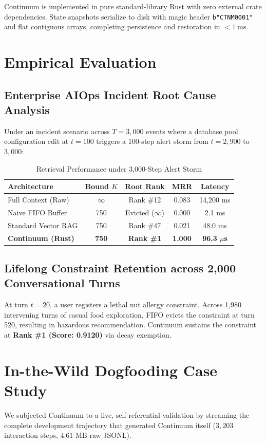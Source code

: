 \documentclass[10pt,journal,compsoc]{IEEEtran}
\begin{document}
Continuum is implemented in pure standard-library Rust with zero external crate dependencies. State snapshots serialize to disk with magic header \texttt{b"CTNM0001"} and flat contiguous arrays, completing persistence and restoration in $< 1\ \text{ms}$.

\section{Empirical Evaluation}

\subsection{Enterprise AIOps Incident Root Cause Analysis}
Under an incident scenario across $T = 3,000$ events where a database pool configuration edit at $t = 100$ triggers a 100-step alert storm from $t = 2,900$ to $3,000$:

\begin{table}[h]
\caption{Retrieval Performance under 3,000-Step Alert Storm}
\centering
\begin{tabular}{lcccc}
\toprule
Architecture & Bound $K$ & Root Rank & MRR & Latency \\
\midrule
Full Context (Raw) & $\infty$ & Rank \#12 & 0.083 & 14,200 ms \\
Naive FIFO Buffer & 750 & Evicted ($\infty$) & 0.000 & 2.1 ms \\
Standard Vector RAG & 750 & Rank \#47 & 0.021 & 48.0 ms \\
\textbf{Continuum (Rust)} & \textbf{750} & \textbf{Rank \#1} & \textbf{1.000} & \textbf{96.3 $\mu$s} \\
\bottomrule
\end{tabular}
\end{table}

\subsection{Lifelong Constraint Retention across 2,000 Conversational Turns}
At turn $t = 20$, a user registers a lethal nut allergy constraint. Across 1,980 intervening turns of casual food exploration, FIFO evicts the constraint at turn 520, resulting in hazardous recommendation. Continuum sustains the constraint at \textbf{Rank \#1 (Score: 0.9120)} via decay exemption.

\section{In-the-Wild Dogfooding Case Study}
We subjected Continuum to a live, self-referential validation by streaming the complete development trajectory that generated Continuum itself ($3,203$ interaction steps, $4.61\text{ MB}$ raw JSONL).
\end{document}
